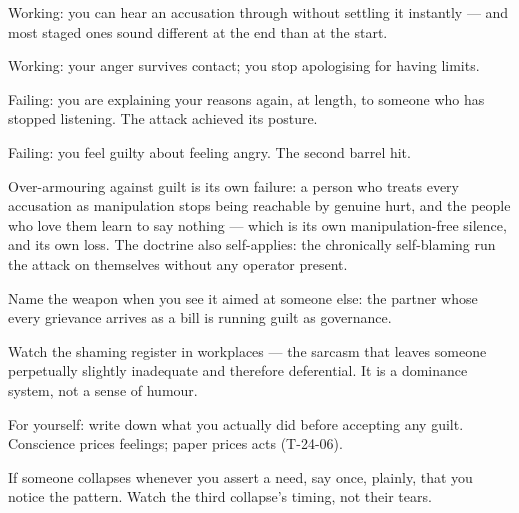 \begin{feedback}
  \item Working: you can hear an accusation through without settling it instantly --- and most staged ones sound different at the end than at the start.
  \item Working: your anger survives contact; you stop apologising for having limits.
  \item Failing: you are explaining your reasons again, at length, to someone who has stopped listening. The attack achieved its posture.
  \item Failing: you feel guilty about feeling angry. The second barrel hit.
\end{feedback}
\begin{failure}
Over-armouring against guilt is its own failure: a person who treats every accusation as manipulation stops being reachable by genuine hurt, and the people who love them learn to say nothing --- which is its own manipulation-free silence, and its own loss. The doctrine also self-applies: the chronically self-blaming run the attack on themselves without any operator present.
\end{failure}
\begin{countermeasures}
  \item Name the weapon when you see it aimed at someone else: the partner whose every grievance arrives as a bill is running guilt as governance.
  \item Watch the shaming register in workplaces --- the sarcasm that leaves someone perpetually slightly inadequate and therefore deferential. It is a dominance system, not a sense of humour.
  \item For yourself: write down what you actually did before accepting any guilt. Conscience prices feelings; paper prices acts (T-24-06).
  \item If someone collapses whenever you assert a need, say once, plainly, that you notice the pattern. Watch the third collapse's timing, not their tears.
\end{countermeasures}

\seesources
{}

